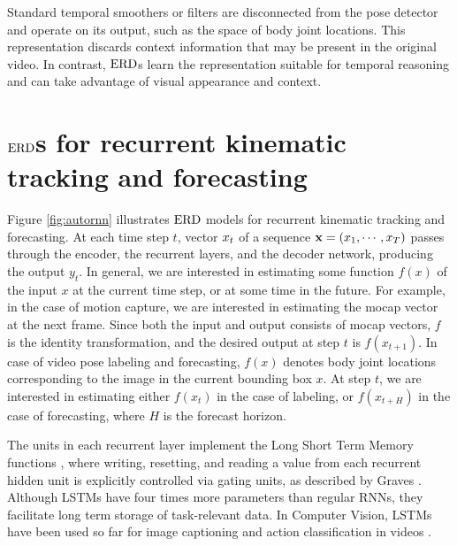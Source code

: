 \documentclass[10pt,twocolumn,letterpaper]{article}
\begin{document}
Standard temporal smoothers or filters are  disconnected from the pose detector and operate on its output, such as the space of body joint locations. This representation discards context information that may be present in the original video. In contrast, $\text{ERD}$s learn the  representation suitable for temporal reasoning and can take advantage of visual appearance and context.














 \section{$\text{ERD}$s for recurrent kinematic tracking and forecasting}



Figure \ref{fig:autornn} illustrates   $\text{ERD}$ models for recurrent kinematic tracking and forecasting.    
At  each time step $t$, vector $x_t$ of a sequence  $\mathbf{x}=(x_1, \cdots, x_T)$ passes through the encoder, the recurrent layers, and the decoder network, producing the output $y_t$. 
In general, we are interested in estimating some function $f(x)$ of the input $x$ at the current time step, or at some time in the future. For example, in the case of motion capture, we are interested in estimating the mocap vector at the next frame. Since both the input and output consists of mocap vectors, $f$ is the identity transformation, and the desired output at step $t$ is $f(x_{t+1})$.
In case of video pose labeling and forecasting, $f(x)$ denotes body joint locations corresponding to the image in the current bounding box $x$. At step $t$, we are interested in estimating either $f(x_t)$ in the case of labeling, or $f(x_{t+H})$ in the case of forecasting, where $H$ is the forecast horizon.



The units in each recurrent layer  implement the Long Short Term Memory functions \cite{Hochreiter:1997:LSM:1246443.1246450}, where writing, resetting, and reading a value from each recurrent hidden unit is explicitly controlled via gating units, as described by Graves \cite{DBLP:journals/corr/Graves13}. Although LSTMs have four times more parameters than regular RNNs, they  facilitate long term storage of task-relevant data. In Computer Vision, LSTMs have been used  so far for image captioning  \cite{DBLP:journals/corr/VinyalsTBE14} and action classification in videos \cite{DBLP:journals/corr/DonahueHGRVSD14}.   
\end{document}

